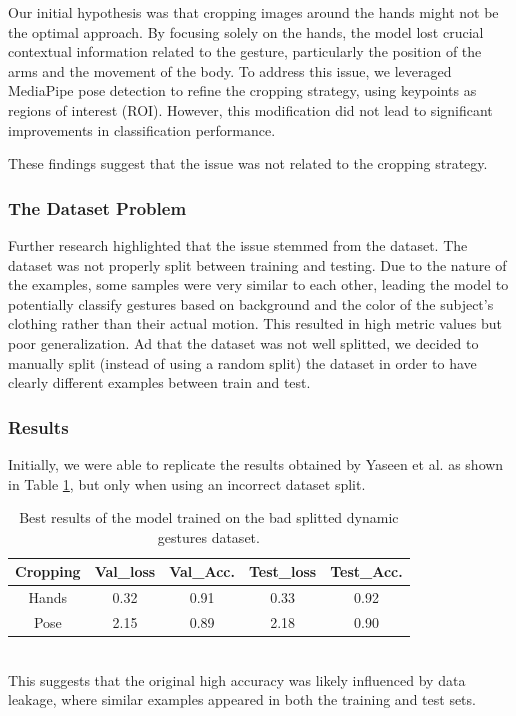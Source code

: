 \documentclass[10pt,twocolumn,letterpaper]{article}
\begin{document}
Our initial hypothesis was that cropping images around the hands might not be the optimal approach. By focusing solely on the hands, the model lost crucial contextual information related to the gesture, particularly the position of the arms and the movement of the body.
To address this issue, we leveraged MediaPipe pose detection to refine the cropping strategy, using keypoints as regions of interest (ROI). However, this modification did not lead to significant improvements in classification performance.  

These findings suggest that the issue was not related to the cropping strategy.  

\subsubsection{The Dataset Problem}
Further research highlighted that the issue stemmed from the dataset. The dataset was not properly split between training and testing.  
Due to the nature of the examples, some samples were very similar to each other, leading the model to potentially classify gestures based on background and the color of the subject’s clothing rather than their actual motion.  
This resulted in high metric values but poor generalization.  
Ad that the dataset was not well splitted, we decided to manually split (instead of using a random split) the dataset in order to have clearly different examples between train and test.

\subsubsection{Results}
Initially, we were able to replicate the results obtained by Yaseen et al. \cite{electronics13163233}
as shown in Table \ref{tab:dynamicGesturesBad}, but only when using an incorrect dataset split.  
\begin{table}[h]
   \begin{center}
   \begin{tabular}{|c|c|c|c|c|}
   \hline
   \textbf{Cropping} & \textbf{Val\_loss} & \textbf{Val\_Acc.} & \textbf{Test\_loss} & \textbf{Test\_Acc.}\\
   \hline\hline
   Hands & 0.32 & 0.91 & 0.33 & 0.92 \\
   Pose & 2.15 & 0.89 & 2.18 & 0.90 \\
   \hline
   \end{tabular}
   \end{center}
   \caption{Best results of the model trained on the bad splitted dynamic gestures dataset.}
   \label{tab:dynamicGesturesBad}
\end{table} \\
This suggests that the original high accuracy was likely influenced by data leakage, where similar examples appeared in both the training and test sets. 
\end{document}
